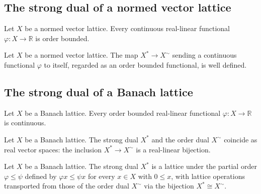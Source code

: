 \subsection{The strong dual of a normed vector lattice}

\begin{theorem}
\label{thm:strongDual-isOrderBounded}
\leanok
{}
Let $X$ be a normed vector lattice. Every continuous real-linear
functional $\varphi \colon X \to \mathbb{R}$ is order bounded.
\end{theorem}

\begin{definition}
\label{def:strongDual-toOrderDualSpace}
\leanok
{}
Let $X$ be a normed vector lattice. The map $X^{*} \to X^{\sim}$
sending a continuous functional $\varphi$ to itself, regarded as
an order bounded functional, is well defined.
\end{definition}

\subsection{The strong dual of a Banach lattice}

\begin{theorem}
\label{thm:strongDual-ofOrderDualSpace}
\leanok
{}
Let $X$ be a Banach lattice. Every order bounded real-linear
functional $\varphi \colon X \to \mathbb{R}$ is continuous.
\end{theorem}

\begin{theorem}
\label{thm:strongDual-equivOrderDualSpace}
\leanok
{}
Let $X$ be a Banach lattice. The strong dual $X^{*}$ and the order
dual $X^{\sim}$ coincide as real vector spaces: the inclusion
$X^{*} \to X^{\sim}$ is a real-linear bijection.
\end{theorem}

\begin{theorem}
\label{thm:strongDual-instLattice}
\leanok
{}
Let $X$ be a Banach lattice. The strong dual $X^{*}$ is a lattice
under the partial order $\varphi \le \psi$ defined by $\varphi x
\le \psi x$ for every $x \in X$ with $0 \le x$, with lattice
operations transported from those of the order dual $X^{\sim}$
via the bijection $X^{*} \cong X^{\sim}$.
\end{theorem}

